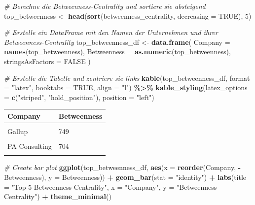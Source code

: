 \documentclass[
]{article}
\newenvironment{Shaded}{\begin{snugshade}}{\end{snugshade}}
\newcommand{\AttributeTok}[1]{\textcolor[rgb]{0.13,0.29,0.53}{#1}}
\newcommand{\CommentTok}[1]{\textcolor[rgb]{0.56,0.35,0.01}{\textit{#1}}}
\newcommand{\ConstantTok}[1]{\textcolor[rgb]{0.56,0.35,0.01}{#1}}
\newcommand{\DecValTok}[1]{\textcolor[rgb]{0.00,0.00,0.81}{#1}}
\newcommand{\FunctionTok}[1]{\textcolor[rgb]{0.13,0.29,0.53}{\textbf{#1}}}
\newcommand{\NormalTok}[1]{#1}
\newcommand{\OtherTok}[1]{\textcolor[rgb]{0.56,0.35,0.01}{#1}}
\newcommand{\SpecialCharTok}[1]{\textcolor[rgb]{0.81,0.36,0.00}{\textbf{#1}}}
\newcommand{\StringTok}[1]{\textcolor[rgb]{0.31,0.60,0.02}{#1}}
\begin{document}
\begin{Shaded}
\begin{Highlighting}[]
\CommentTok{\# Berechne die Betweenness{-}Centrality und sortiere sie absteigend}
\NormalTok{top\_betweenness }\OtherTok{\textless{}{-}} \FunctionTok{head}\NormalTok{(}\FunctionTok{sort}\NormalTok{(betweenness\_centrality, }\AttributeTok{decreasing =} \ConstantTok{TRUE}\NormalTok{), }\DecValTok{5}\NormalTok{)}

\CommentTok{\# Erstelle ein DataFrame mit den Namen der Unternehmen und ihrer Betweenness{-}Centrality}
\NormalTok{top\_betweenness\_df }\OtherTok{\textless{}{-}} \FunctionTok{data.frame}\NormalTok{(}
  \AttributeTok{Company =} \FunctionTok{names}\NormalTok{(top\_betweenness),}
  \AttributeTok{Betweenness =} \FunctionTok{as.numeric}\NormalTok{(top\_betweenness),}
  \AttributeTok{stringsAsFactors =} \ConstantTok{FALSE}
\NormalTok{)}

\CommentTok{\# Erstelle die Tabelle und zentriere sie links}
\FunctionTok{kable}\NormalTok{(top\_betweenness\_df, }\AttributeTok{format =} \StringTok{"latex"}\NormalTok{, }\AttributeTok{booktabs =} \ConstantTok{TRUE}\NormalTok{, }\AttributeTok{align =} \StringTok{"l"}\NormalTok{) }\SpecialCharTok{\%\textgreater{}\%}
\FunctionTok{kable\_styling}\NormalTok{(}\AttributeTok{latex\_options =} \FunctionTok{c}\NormalTok{(}\StringTok{"striped"}\NormalTok{, }\StringTok{"hold\_position"}\NormalTok{), }\AttributeTok{position =} \StringTok{"left"}\NormalTok{)}
\end{Highlighting}
\end{Shaded}

\begin{tabular}{ll}
\toprule
Company & Betweenness\\
\midrule
\cellcolor{gray!10}{Booz Allen Hamilton} & \cellcolor{gray!10}{830}\\
Gallup & 749\\
\cellcolor{gray!10}{McKinsey \& Company} & \cellcolor{gray!10}{713}\\
PA Consulting & 704\\
\cellcolor{gray!10}{General Dynamics Information Technology} & \cellcolor{gray!10}{695}\\
\bottomrule
\end{tabular}

\begin{Shaded}
\begin{Highlighting}[]
\CommentTok{\# Create bar plot}
\FunctionTok{ggplot}\NormalTok{(top\_betweenness\_df, }\FunctionTok{aes}\NormalTok{(}\AttributeTok{x =} \FunctionTok{reorder}\NormalTok{(Company, }\SpecialCharTok{{-}}\NormalTok{Betweenness), }\AttributeTok{y =}\NormalTok{ Betweenness)) }\SpecialCharTok{+}
  \FunctionTok{geom\_bar}\NormalTok{(}\AttributeTok{stat =} \StringTok{"identity"}\NormalTok{) }\SpecialCharTok{+}
  \FunctionTok{labs}\NormalTok{(}\AttributeTok{title =} \StringTok{"Top 5 Betweenness Centrality"}\NormalTok{,}
       \AttributeTok{x =} \StringTok{"Company"}\NormalTok{,}
       \AttributeTok{y =} \StringTok{"Betweenness Centrality"}\NormalTok{) }\SpecialCharTok{+}
  \FunctionTok{theme\_minimal}\NormalTok{()}
\end{Highlighting}
\end{Shaded}
\end{document}

